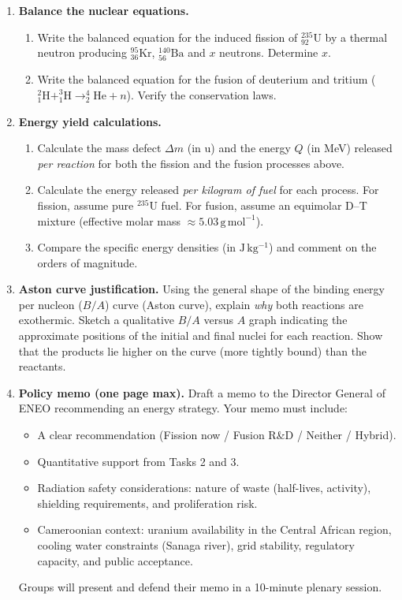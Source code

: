 \documentclass[11pt]{article}
\newcounter{popsec}
\newcounter{popsub}
\newcommand{\courssub}[1]{%
  \stepcounter{popsub}%
  \par\vspace{9pt}\noindent{\popxbold\fontsize{11.5}{13}\selectfont\color{popink}{\color{poporange}\thepopsec.\thepopsub}\hspace{6pt}#1}\par\nopagebreak\vspace{4pt}
}
\begin{document}
\courssub{Tasks}
\begin{enumerate}
    \item \textbf{Balance the nuclear equations.}
    \begin{enumerate}
        \item Write the balanced equation for the induced fission of $^{235}_{92}\mathrm{U}$ by a thermal neutron producing $^{95}_{36}\mathrm{Kr}$, $^{140}_{56}\mathrm{Ba}$ and $x$ neutrons. Determine $x$.
        \item Write the balanced equation for the fusion of deuterium and tritium ($^{2}_{1}\mathrm{H} + ^{3}_{1}\mathrm{H} \rightarrow ^{4}_{2}\mathrm{He} + n$). Verify the conservation laws.
    \end{enumerate}
    \item \textbf{Energy yield calculations.}
    \begin{enumerate}
        \item Calculate the mass defect $\Delta m$ (in u) and the energy $Q$ (in MeV) released \emph{per reaction} for both the fission and the fusion processes above.
        \item Calculate the energy released \emph{per kilogram of fuel} for each process. For fission, assume pure $^{235}\mathrm{U}$ fuel. For fusion, assume an equimolar D--T mixture (effective molar mass $\approx 5.03\,\mathrm{g\,mol^{-1}}$).
        \item Compare the specific energy densities (in $\mathrm{J\,kg^{-1}}$) and comment on the orders of magnitude.
    \end{enumerate}
    \item \textbf{Aston curve justification.}
    Using the general shape of the binding energy per nucleon ($B/A$) curve (Aston curve), explain \emph{why} both reactions are exothermic. Sketch a qualitative $B/A$ versus $A$ graph indicating the approximate positions of the initial and final nuclei for each reaction. Show that the products lie higher on the curve (more tightly bound) than the reactants.
    \item \textbf{Policy memo (one page max).}
    Draft a memo to the Director General of ENEO recommending an energy strategy. Your memo must include:
    \begin{itemize}
        \item A clear recommendation (Fission now / Fusion R\&D / Neither / Hybrid).
        \item Quantitative support from Tasks 2 and 3.
        \item Radiation safety considerations: nature of waste (half-lives, activity), shielding requirements, and proliferation risk.
        \item Cameroonian context: uranium availability in the Central African region, cooling water constraints (Sanaga river), grid stability, regulatory capacity, and public acceptance.
    \end{itemize}
    Groups will present and defend their memo in a 10-minute plenary session.
\end{enumerate}
\end{document}
